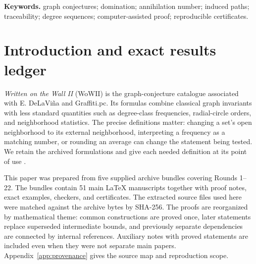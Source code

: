 \documentclass[11pt,a4paper]{article}
\theoremstyle{definition}\newtheorem{definition}[theorem]{Definition}
\theoremstyle{remark}\newtheorem{remark}[theorem]{Remark}
\begin{document}
\smallskip
\noindent\textbf{Keywords.} graph conjectures; domination; annihilation
number; induced paths; traceability; degree sequences; computer-assisted
proof; reproducible certificates.

\clearpage
\tableofcontents
\clearpage

\section{Introduction and exact results ledger}
\label{sec:introduction}
\emph{Written on the Wall II} (WoWII) is the graph-conjecture catalogue
associated with E. DeLaVi\~na and Graffiti.pc. Its formulas combine
classical graph invariants with less standard quantities such as
degree-class frequencies, radial-circle orders, and neighborhood
statistics. The precise definitions matter: changing a set's open
neighborhood to its external neighborhood, interpreting a frequency
as a matching number, or rounding an average can change the statement
being tested. We retain the archived formulations and give each
needed definition at its point of use \cite{src:catalogue,src:definitions}.

This paper was prepared from five supplied archive bundles covering
Rounds 1--22. The bundles contain 51 main \LaTeX{} manuscripts together
with proof notes, exact examples, checkers, and certificates. The
extracted source files used here were matched against the archive
bytes by SHA-256. The proofs are reorganized by mathematical theme:
common constructions are proved once, later statements replace
superseded intermediate bounds, and previously separate dependencies
are connected by internal references. Auxiliary notes with proved
statements are included even when they were not separate main papers.
Appendix~\ref{app:provenance} gives the source map and reproduction scope.
\end{document}
